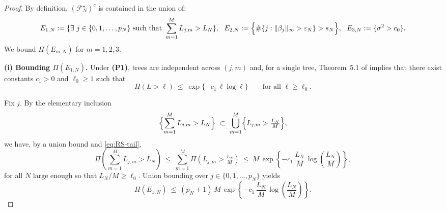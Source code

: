 \documentclass[11pt]{article}
\theoremstyle{plain}
\theoremstyle{definition}
\theoremstyle{plain}
\begin{document}
\begin{proof}
By definition, $(\mathcal F_N^\star)^c$ is contained in the union of:
\[
E_{1,N} := \{\exists \ j \in \{0,1,\dots,p_N\} \ \text{such that} \ \sum_{m=1}^{M} L_{j,m} > L_N \},\ \
E_{2,N} := \Bigl\{\#\{j:\|\beta_j\|_\infty>\varepsilon_N\}> s_N\Bigr\},\ \
E_{3,N} := \{\sigma^2>c_0\}.
\]
We bound $\Pi(E_{m,N})$ for $m=1,2,3$.

\medskip\noindent\textbf{(i) Bounding $\Pi(E_{1,N})$.}
Under \textbf{(P1)}, trees are independent across $(j,m)$ and, for a single tree,
Theorem~5.1 of \citet{rockovasaha} implies that there exist constants $c_1>0$ and $\ell_0\ge 1$ such that
\begin{equation}\label{eq:RS-tail}
\Pi(L>\ell)\ \le\ \exp\{-c_1\,\ell\log \ell\}\qquad\text{for all }\ell\ge \ell_0.
\end{equation}

Fix $j$. By the elementary inclusion
\[
\Bigl\{\sum_{m=1}^{M}L_{j,m}>L_N\Bigr\}\ \subset\ \bigcup_{m=1}^{M}\Bigl\{L_{j,m}>\tfrac{L_N}{M}\Bigr\},
\]
we have, by a union bound and \eqref{eq:RS-tail},
\begin{equation}\label{eq:perj-tail}
\Pi\!\left(\sum_{m=1}^{M} L_{j,m}>L_N\right)
\ \le\ 
\sum_{m=1}^{M}\Pi\!\left(L_{j,m}>\tfrac{L_N}{M}\right)
\ \le\
M\,\exp\!\left\{-c_1\,\frac{L_N}{M}\,\log \left(\frac{L_N}{M}\right)\right\},
\end{equation}
for all $N$ large enough so that $L_N/M\ge \ell_0$.
Union bounding over $j\in\{0,1,\dots,p_N\}$ yields
\begin{equation}\label{eq:E1N-union}
\Pi(E_{1,N})
\ \le\ 
(p_N+1)\,M\,\exp\!\left\{-c_1\,\frac{L_N}{M}\,\log \left(\frac{L_N}{M}\right)\right\}.
\end{equation}


\end{proof}
\end{document}
